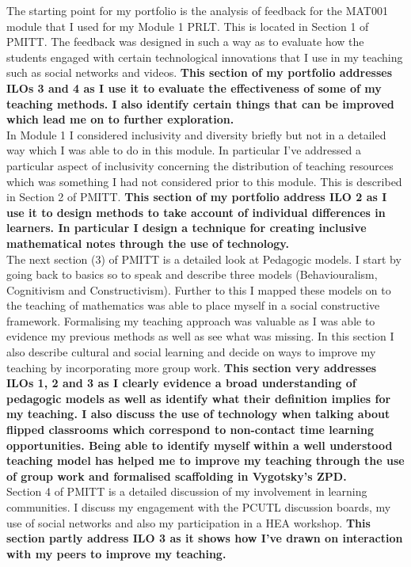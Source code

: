 \documentclass[a4paper,12pt]{article}
\begin{document}
The starting point for my portfolio is the analysis of feedback for the MAT001 module that I used for my Module 1 PRLT. This is located in Section 1 of PMITT. The feedback was designed in such a way as to evaluate how the students engaged with certain technological innovations that I use in my teaching such as social networks and videos. \textbf{This section of my portfolio addresses ILOs 3 and 4 as I use it to evaluate the effectiveness of some of my teaching methods. I also identify certain things that can be improved which lead me on to further exploration.}\\

In Module 1 I considered inclusivity and diversity briefly but not in a detailed way which I was able to do in this module. In particular I've addressed a particular aspect of inclusivity concerning the distribution of teaching resources which was something I had not considered prior to this module. This is described in Section 2 of PMITT. \textbf{This section of my portfolio address ILO 2 as I use it to design methods to take account of individual differences in learners. In particular I design a technique for creating inclusive mathematical notes through the use of technology.}\\

The next section (3) of PMITT is a detailed look at Pedagogic models. I start by going back to basics so to speak and describe three models (Behaviouralism, Cognitivism and Constructivism). Further to this I mapped these models on to the teaching of mathematics was able to place myself in a social constructive framework. Formalising my teaching approach was valuable as I was able to evidence my previous methods as well as see what was missing. In this section I also describe cultural and social learning and decide on ways to improve my teaching by incorporating more group work. \textbf{This section very addresses ILOs 1, 2 and 3 as I clearly evidence a broad understanding of pedagogic models as well as identify what their definition implies for my teaching. I also discuss the use of technology when talking about flipped classrooms which correspond to non-contact time learning opportunities. Being able to identify myself within a well understood teaching model has helped me to improve my teaching through the use of group work and formalised scaffolding in Vygotsky's ZPD.}\\

Section 4 of PMITT is a detailed discussion of my involvement in learning communities. I discuss my engagement with the PCUTL discussion boards, my use of social networks and also my participation in a HEA workshop. \textbf{This section partly address ILO 3 as it shows how I've drawn on interaction with my peers to improve my teaching.}\\
\end{document}
